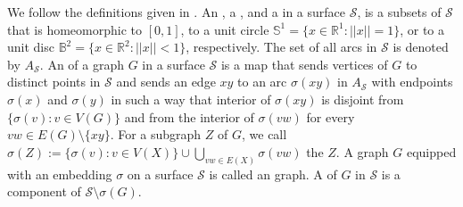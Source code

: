 We follow the definitions given in \citet[Appendix~B]{diestel:graph}. An , a , and a  in a surface $\mathcal{S}$, is a subsets of $\mathcal{S}$ that is homeomorphic to $[0, 1]$, to a unit circle $\mathbb{S}^1 = \{x \in \mathbb{R}^1: ||x|| = 1\}$, or to a unit disc $\mathbb{B}^2 = \{x \in \mathbb{R}^2 : ||x|| < 1\}$, respectively.
The set of all arcs in $\mathcal{S}$ is denoted by $A_\mathcal{S}$.
An  of a graph $G$ in a surface $\mathcal{S}$ is a map  that sends vertices of $G$ to distinct points in $\mathcal{S}$ and sends an edge $xy$ to
an arc $\sigma(xy)$ in $A_\mathcal{S}$ with endpoints $\sigma(x)$ and $\sigma(y)$ in such a way that interior of $\sigma(xy)$ is disjoint from $\{\sigma(v):v\in V(G)\}$ and from the interior of $\sigma(vw)$ for every $vw\in E(G)\setminus\{xy\}$.  For a subgraph $Z$ of $G$, we call $\sigma(Z):=\{\sigma(v):v\in V(X)\}\cup \bigcup_{vw\in E(X)}\sigma(vw)$ the  $Z$.
A graph $G$ equipped with an embedding $\sigma$ on a surface $\mathcal{S}$ is called an  graph. A  of $G$ in $\mathcal{S}$ is a component of $\mathcal{S} \setminus \sigma(G)$.


